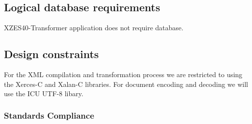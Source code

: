 \subsection{Logical database requirements}

XZES40-Transformer application does not require database. 

\subsection{Design constraints}


For the XML compilation and transformation process we are restricted to using the Xerces-C and Xalan-C libraries.
For document encoding and decoding we will use the ICU UTF-8 libary.

\subsubsection{Standards Compliance}

